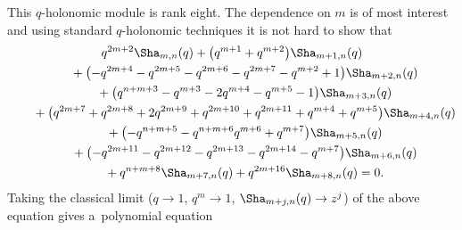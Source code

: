 \documentclass[pdftex]{sigma}
\numberwithin{equation}{section}
\def\BZ{\mathbb{Z}}
\def\WRT{\Sha}
\def\BZ{\mathbb Z}
\begin{document}
This $q$-holonomic module is rank eight. The dependence on $m$ is of most interest and using standard $q$-holonomic techniques it is not hard to show that
\begin{gather}
 q^{2m+2}\WRT_{m,n}(q)+\bigl(q^{m+1}+q^{m+2}\bigr)\WRT_{m+1,n}(q) \nonumber\\
 \qquad{}+\bigl(-q^{2m+4}-q^{2m+5}-q^{2m+6}-q^{2m+7}-q^{m+2}+1\bigr)\WRT_{m+2,n}(q) \nonumber\\
 \qquad{}+\bigl(q^{n+m+3}-q^{m+3}-2q^{m+4}-q^{m+5}-1\bigr)\WRT_{m+3,n}(q) \nonumber\\
 \qquad{}+\bigl(q^{2m+7}+q^{2m+8}+2q^{2m+9}+q^{2m+10}+q^{2m+11}+q^{m+4}+q^{m+5}\bigr)\WRT_{m+4,n}(q) \nonumber\\
 \qquad{}+\bigl(-q^{n+m+5}-q^{n+m+6}q^{m+6}+q^{m+7}\bigr)\WRT_{m+5,n}(q)\nonumber\\
 \qquad{}+\bigl(-q^{2m+11}-q^{2m+12}-q^{2m+13}-q^{2m+14}-q^{m+7}\bigr)\WRT_{m+6,n}(q) \nonumber\\
 \qquad{}+q^{n+m+8}\WRT_{m+7,n}(q)+q^{2m+16}\WRT_{m+8,n}(q) =0 .\label{8thorderqdiff}
\end{gather}
Taking the classical limit \big($q\to 1$, $q^m\to 1$, $\WRT_{m+j,n}(q)\to z^j$\big) of the above equation gives a~polynomial equation
\end{document}
